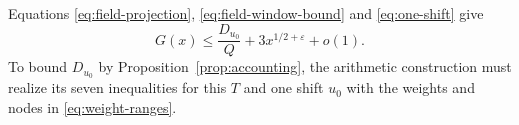 Equations \eqref{eq:field-projection}, \eqref{eq:field-window-bound}
and \eqref{eq:one-shift} give
\[
  G(x)\le \frac{D_{u_0}}{Q}+3x^{1/2+\varepsilon}+o(1).
\]
To bound $D_{u_0}$ by Proposition~\ref{prop:accounting}, the arithmetic
construction must realize its seven inequalities for this $T$ and one
shift $u_0$ with the weights and nodes in \eqref{eq:weight-ranges}.
